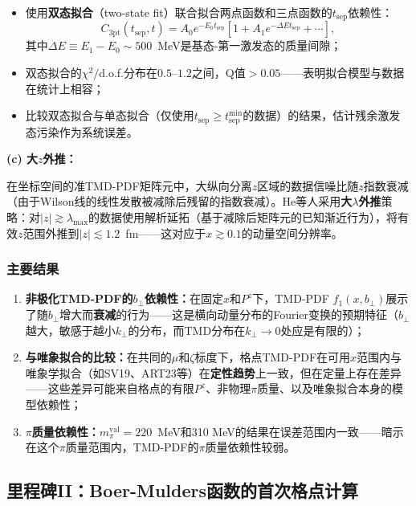\documentclass[12pt,a4paper]{ctexart}
\theoremstyle{definition}
\begin{document}
\begin{itemize}
    \item 使用\textbf{双态拟合}（two-state fit）联合拟合两点函数和三点函数的$t_{\text{sep}}$依赖性：
    \begin{equation}
    C_{3\text{pt}}(t_{\text{sep}}, t) = A_0 e^{-E_0 t_{\text{sep}}} \left[1 + A_1 e^{-\Delta E t_{\text{sep}}} + \cdots\right],
    \end{equation}
    其中$\Delta E \equiv E_1 - E_0 \sim 500$~MeV是基态-第一激发态的质量间隙；
    \item 双态拟合的$\chi^2/$d.o.f.分布在$0.5\text{--}1.2$之间，Q值$>0.05$——表明拟合模型与数据在统计上相容；
    \item 比较双态拟合与单态拟合（仅使用$t_{\text{sep}} \ge t_{\text{sep}}^{\min}$的数据）的结果，估计残余激发态污染作为系统误差。
\end{itemize}

\textbf{(c) 大$z$外推：}

在坐标空间的准TMD-PDF矩阵元中，大纵向分离$z$区域的数据信噪比随$z$指数衰减（由于Wilson线的线性发散被减除后残留的指数衰减）。He等人采用\textbf{大$\lambda$外推}策略：对$|z| \gtrsim \lambda_{\max}$的数据使用解析延拓（基于减除后矩阵元的已知渐近行为），将有效$z$范围外推到$|z| \lesssim 1.2$~fm——这对应于$x \gtrsim 0.1$的动量空间分辨率。

\subsubsection{主要结果}

\begin{enumerate}
    \item \textbf{非极化TMD-PDF的$b_\perp$依赖性：}在固定$x$和$P^z$下，TMD-PDF $f_1(x, b_\perp)$展示了随$b_\perp$增大而\textbf{衰减}的行为——这是横向动量分布的Fourier变换的预期特征（$b_\perp$越大，敏感于越小$k_\perp$的分布，而TMD分布在$k_\perp \to 0$处应是有限的）；
    \item \textbf{与唯象拟合的比较：}在共同的$\mu$和$\zeta$标度下，格点TMD-PDF在可用$x$范围内与唯象学拟合（如SV19、ART23等）在\textbf{定性趋势}上一致，但在定量上存在差异——这些差异可能来自格点的有限$P^z$、非物理$\pi$质量、以及唯象拟合本身的模型依赖性；
    \item \textbf{$\pi$质量依赖性：}$m_\pi^{\text{val}} = 220$~MeV和310 MeV的结果在误差范围内一致——暗示在这个$\pi$质量范围内，TMD-PDF的$\pi$质量依赖性较弱。
\end{enumerate}

\subsection{里程碑II：Boer-Mulders函数的首次格点计算~\cite{Ma2025BoerMulders}}
\end{document}
